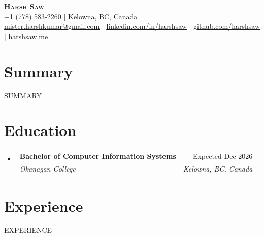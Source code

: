 \documentclass[letterpaper,11pt]{article}
\makeatletter
\newcommand{\resumeSubheading}[4]{
  \vspace{-2pt}\item
    \begin{tabular*}{0.97\textwidth}[t]{l@{\extracolsep{\fill}}r}
      \textbf{#1} & #2 \\
      \textit{\small#3} & \textit{\small #4} \\
    \end{tabular*}\vspace{-7pt}
}
\newcommand{\resumeSubHeadingListStart}{\begin{itemize}[leftmargin=0.15in, label={}]}
\newcommand{\resumeSubHeadingListEnd}{\end{itemize}}
\makeatother
\begin{document}
\begin{center}
    \textbf{\Huge \scshape Harsh Saw} \\ \vspace{1pt}
    \small +1 (778) 583-2260 $|$ Kelowna, BC, Canada \\
    \href{mailto:mister.harshkumar@gmail.com}{\underline{mister.harshkumar@gmail.com}} $|$
    \href{https://linkedin.com/in/harshsaw}{\underline{linkedin.com/in/harshsaw}} $|$
    \href{https://github.com/harshsaw}{\underline{github.com/harshsaw}} $|$
    \href{https://harshsaw.me}{\underline{harshsaw.me}}
\end{center}

\section{Summary}
\small{{SUMMARY}}

\section{Education}
  \resumeSubHeadingListStart
    \resumeSubheading
      {Bachelor of Computer Information Systems}{Expected Dec 2026}
      {Okanagan College}{Kelowna, BC, Canada}
  \resumeSubHeadingListEnd

\section{Experience}
  \resumeSubHeadingListStart
{{EXPERIENCE}}
  \resumeSubHeadingListEnd

\end{document}
